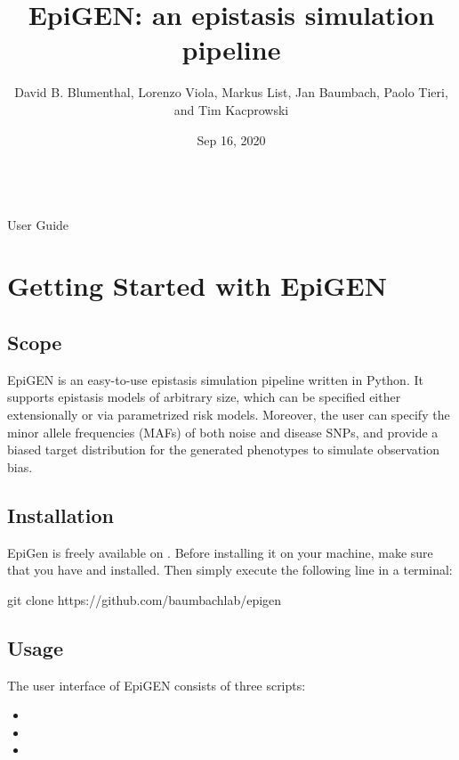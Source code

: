 \documentclass[a4paper,10pt,english]{sphinxhowto}
\title{EpiGEN: an epistasis simulation pipeline}
\date{Sep 16, 2020}
\author{David B. Blumenthal, Lorenzo Viola, Markus List, Jan Baumbach, Paolo Tieri, and Tim Kacprowski}
\begin{document}
\pagestyle{empty}
\makeatletter\py@HeaderFamily\raggedright{\huge\@title}\\[24pt]{\Large User Guide}\\[24pt]{\large\@author}\makeatother\normalfont
\pagestyle{plain}
\sphinxtableofcontents
\pagestyle{normal}
\label{\detokenize{index::doc}}



\section{Getting Started with EpiGEN}
\label{\detokenize{README:getting-started-with-epigen}}\label{\detokenize{README::doc}}

\subsection{Scope}
\label{\detokenize{README:scope}}
EpiGEN is an easy-to-use epistasis simulation pipeline written in Python. It supports epistasis models of arbitrary size, which can be specified either extensionally or via parametrized risk models. Moreover, the user can specify the minor allele frequencies (MAFs) of both noise and disease SNPs, and provide a biased target distribution for the generated phenotypes to simulate observation bias.


\subsection{Installation}
\label{\detokenize{README:installation}}
EpiGen is freely available on . Before installing it on your machine, make sure that you have  and  installed. Then simply execute the following line in a terminal:

\begin{sphinxVerbatim}[commandchars=\\\{\}]
git clone https://github.com/baumbachlab/epigen
\end{sphinxVerbatim}


\subsection{Usage}
\label{\detokenize{README:usage}}
The user interface of EpiGEN consists of three scripts:
\begin{itemize}
\item {} 

\item {} 

\item {} 

\end{itemize}
\end{document}
